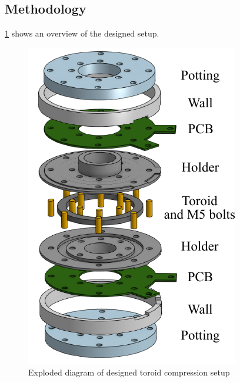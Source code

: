 \documentclass[conference]{IEEEtran}
\begin{document}
\subsection{Methodology}

\cref{fig:compressionholder} shows an overview of the designed setup. 

\begin{figure}
  \centering
  \includegraphics{figures/compressionholder.pdf}
  \caption{Exploded diagram of designed toroid compression setup}
  \label{fig:compressionholder}
\end{figure}
\end{document}
